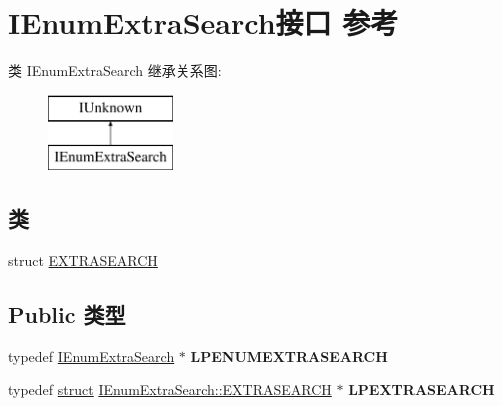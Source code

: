 \hypertarget{interface_i_enum_extra_search}{}\section{I\+Enum\+Extra\+Search接口 参考}
\label{interface_i_enum_extra_search}
类 I\+Enum\+Extra\+Search 继承关系图\+:\begin{figure}[H]
\begin{center}
\leavevmode
\includegraphics[height=2.000000cm]{interface_i_enum_extra_search}
\end{center}
\end{figure}
\subsection*{类}
\begin{DoxyCompactItemize}
\item 
struct \hyperlink{struct_i_enum_extra_search_1_1_e_x_t_r_a_s_e_a_r_c_h}{E\+X\+T\+R\+A\+S\+E\+A\+R\+CH}
\end{DoxyCompactItemize}
\subsection*{Public 类型}
\begin{DoxyCompactItemize}
\item 
\mbox{\label{interface_i_enum_extra_search_a4f00837ae758975f9ae72ce3431efdd0}} 
typedef \hyperlink{interface_i_enum_extra_search}{I\+Enum\+Extra\+Search} $\ast$ {\bfseries L\+P\+E\+N\+U\+M\+E\+X\+T\+R\+A\+S\+E\+A\+R\+CH}
\item 
\mbox{\label{interface_i_enum_extra_search_ab56a90af570799d6568ddd270c2a3272}} 
typedef \hyperlink{interfacestruct}{struct} \hyperlink{struct_i_enum_extra_search_1_1_e_x_t_r_a_s_e_a_r_c_h}{I\+Enum\+Extra\+Search\+::\+E\+X\+T\+R\+A\+S\+E\+A\+R\+CH} $\ast$ {\bfseries L\+P\+E\+X\+T\+R\+A\+S\+E\+A\+R\+CH}
\end{DoxyCompactItemize}
